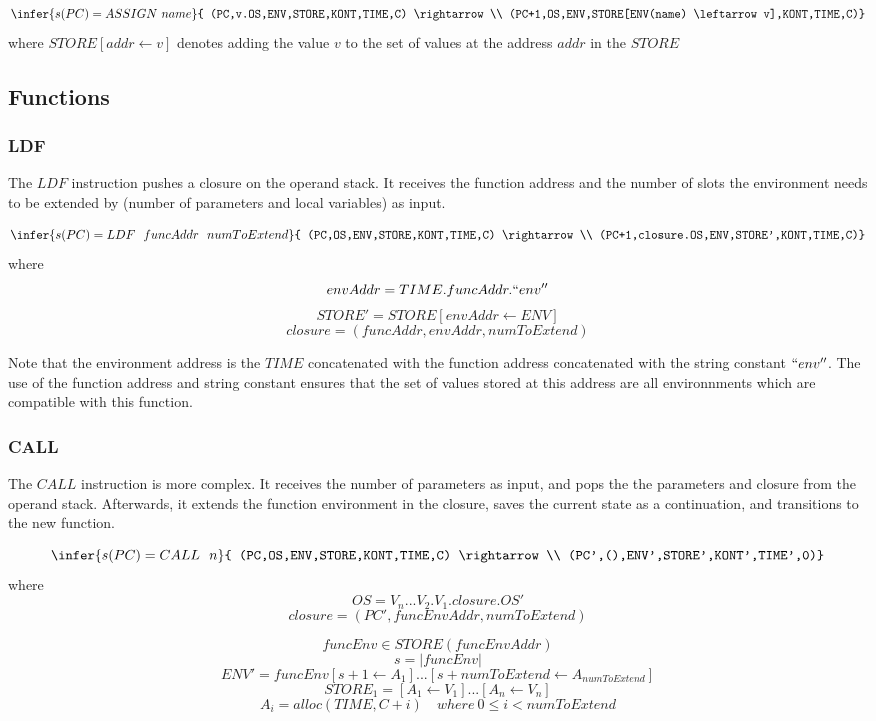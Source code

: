 \documentclass[12pt]{article}
\begin{document}
$$\infer{s(PC) = ASSIGN\ name}{
  (PC,v.OS,ENV,STORE,KONT,TIME,C) \rightarrow \\
  (PC+1,OS,ENV,STORE[ENV(name) \leftarrow v],KONT,TIME,C)}$$
where $STORE[addr \leftarrow v]$ denotes adding the value $v$ to the set of values at the address $addr$ in the $STORE$

\subsection{Functions}
\subsubsection{LDF}
The $LDF$ instruction pushes a closure on the operand stack. It receives the function address and the number of slots the environment needs to be extended by (number of parameters and local variables) as input.

$$\infer{s(PC) = LDF\ \ funcAddr\ \ numToExtend}{
    (PC,OS,ENV,STORE,KONT,TIME,C) \rightarrow \\
    (PC+1,closure.OS,ENV,STORE',KONT,TIME,C)}$$
where
$$envAddr=TIME.funcAddr.``env''$$
$$STORE'=STORE[envAddr \leftarrow ENV]$$
$$closure=(funcAddr,envAddr,numToExtend)$$

Note that the environment address is the $TIME$ concatenated with the function address concatenated with the string constant $``env''$. The use of the function address and string constant ensures that the set of values stored at this address are all environnments which are compatible with this function.

\subsubsection{CALL}
The $CALL$ instruction is more complex. It receives the number of parameters as input, and pops the the parameters and closure from the operand stack. Afterwards, it extends the function environment in the closure, saves the current state as a continuation, and transitions to the new function.

$$\infer{s(PC) = CALL\ \ n}{
    (PC,OS,ENV,STORE,KONT,TIME,C) \rightarrow \\
    (PC',(),ENV',STORE',KONT',TIME',0)}$$
where
$$OS=V_n...V_2.V_1.closure.OS'$$
$$closure=(PC',funcEnvAddr,numToExtend)$$

$$funcEnv \in STORE(funcEnvAddr)$$
$$s=|funcEnv|$$
$$ENV'=funcEnv[s+1 \leftarrow A_1]...[s+numToExtend \leftarrow A_{numToExtend}]$$
$$STORE_1=[A_1 \leftarrow V_1]...[A_n \leftarrow V_n]$$
$$A_i=alloc(TIME,C+i) \quad where\ 0 \leq i < numToExtend$$
\end{document}

